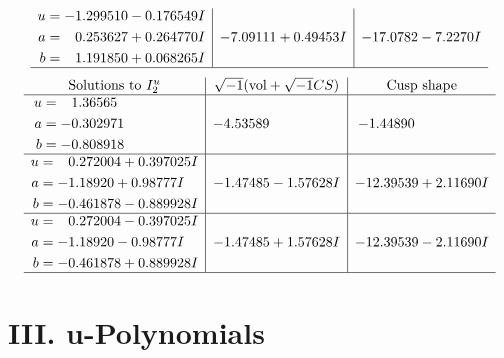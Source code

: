 \documentclass[1p]{elsarticle_modified}
\theoremstyle{definition}
\newcommand{\I}{\sqrt{-1}}
\begin{document}
$$\begin{array}{c|c|c}
\begin{aligned}
u &= -1.299510 - 0.176549 I \\
a &= \phantom{-}0.253627 + 0.264770 I \\
b &= \phantom{-}1.191850 + 0.068265 I\end{aligned}
 & -7.09111 + 0.49453 I & -17.0782 - 7.2270 I\\
 \hline 
 \end{array}$$\newpage$$\begin{array}{c|c|c}  
\text{Solutions to }I^u_{2}& \I (\text{vol} + \sqrt{-1}CS) & \text{Cusp shape}\\
 \hline 
\begin{aligned}
u &= \phantom{-}1.36565\phantom{ +0.000000I} \\
a &= -0.302971\phantom{ +0.000000I} \\
b &= -0.808918\phantom{ +0.000000I}\end{aligned}
 & -4.53589\phantom{ +0.000000I} & -1.44890\phantom{ +0.000000I} \\ \hline\begin{aligned}
u &= \phantom{-}0.272004 + 0.397025 I \\
a &= -1.18920 + 0.98777 I \\
b &= -0.461878 - 0.889928 I\end{aligned}
 & -1.47485 - 1.57628 I & -12.39539 + 2.11690 I \\ \hline\begin{aligned}
u &= \phantom{-}0.272004 - 0.397025 I \\
a &= -1.18920 - 0.98777 I \\
b &= -0.461878 + 0.889928 I\end{aligned}
 & -1.47485 + 1.57628 I & -12.39539 - 2.11690 I\\
 \hline 
 \end{array}$$\newpage
\newpage\renewcommand{\arraystretch}{1}
\centering \section*{ III. u-Polynomials}
\end{document}
